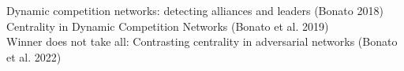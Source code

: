 \documentclass[preview]{standalone}
\begin{document}
Dynamic competition networks: detecting alliances and leaders (Bonato 2018)\\Centrality in Dynamic Competition Networks (Bonato et al. 2019)\\Winner does not take all: Contrasting centrality in adversarial networks (Bonato et al. 2022)\\
\end{document}

